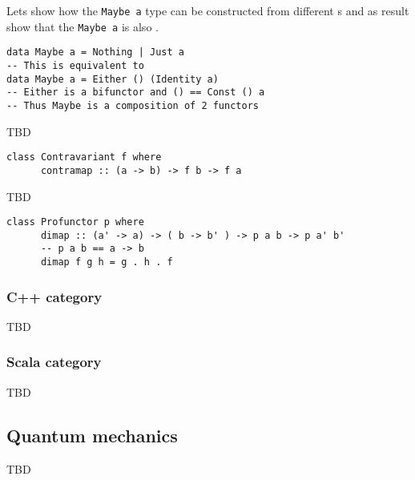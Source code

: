 \begin{example}
\label{ex:maybe_functor}
Lets show how the \texttt{Maybe a} type can be
constructed from different 
s and as result show that the
\texttt{Maybe a} is also 
. 
\begin{verbatim}
data Maybe a = Nothing | Just a
-- This is equivalent to
data Maybe a = Either () (Identity a)
-- Either is a bifunctor and () == Const () a 
-- Thus Maybe is a composition of 2 functors 
\end{verbatim}
\end{example}

\begin{example}
\label{ex:contravariant_functor_hask}
TBD
\begin{verbatim}
class Contravariant f where
      contramap :: (a -> b) -> f b -> f a
\end{verbatim}
\end{example}

\begin{example}
\label{ex:contravariant_functor_hask}
TBD
\begin{verbatim}
class Profunctor p where
      dimap :: (a' -> a) -> ( b -> b' ) -> p a b -> p a' b'
      -- p a b == a -> b
      dimap f g h = g . h . f
\end{verbatim}
\end{example}


\subsubsection{\textbf{C++} category}
TBD

\subsubsection{\textbf{Scala} category}
TBD

\subsection{Quantum mechanics}

TBD
